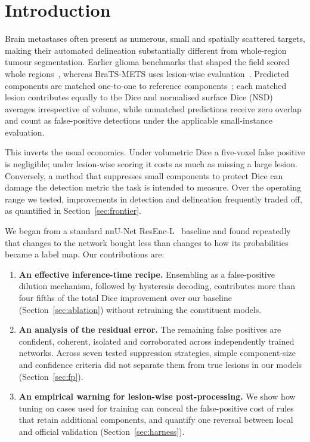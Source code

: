 \documentclass[runningheads]{llncs}
\begin{document}
\section{Introduction}
\label{sec:intro}

Brain metastases often present as numerous, small and spatially scattered targets, making their
automated delineation substantially different from whole-region tumour segmentation. Earlier
glioma benchmarks that shaped the field scored whole regions~\cite{baid2021}, whereas BraTS-METS
uses lesion-wise evaluation~\cite{bratsmet2023,bratsmet2025,brats2026}. Predicted components are
matched one-to-one to reference components~\cite{grosskopf2026matching}; each matched lesion
contributes equally to the Dice and normalised surface Dice (NSD) averages irrespective of volume,
while unmatched predictions receive zero overlap and count as false-positive detections under the
applicable small-instance evaluation.

This inverts the usual economics. Under volumetric Dice a five-voxel false positive is
negligible; under lesion-wise scoring it costs as much as missing a large lesion. Conversely, a
method that suppresses small components to protect Dice can damage the detection metric the task
is intended to measure. Over the operating range we tested, improvements in detection and
delineation frequently traded off, as quantified in Section~\ref{sec:frontier}.

We began from a standard nnU-Net ResEnc-L~\cite{isensee2021nnunet,isensee2024resenc} baseline and
found repeatedly that changes to the network bought less than changes to how its probabilities
became a label map. Our contributions are:

\begin{enumerate}
\item \textbf{An effective inference-time recipe.} Ensembling as a false-positive dilution
      mechanism, followed by hysteresis decoding, contributes more than four fifths of the total
      Dice improvement over our baseline (Section~\ref{sec:ablation}) without retraining the
      constituent models.
\item \textbf{An analysis of the residual error.} The remaining false positives are confident,
      coherent, isolated and corroborated across independently trained networks. Across seven
      tested suppression strategies, simple component-size and confidence criteria did not
      separate them from true lesions in our models (Section~\ref{sec:fp}).
\item \textbf{An empirical warning for lesion-wise post-processing.} We show how tuning on cases
      used for training can conceal the false-positive cost of rules that retain additional
      components, and quantify one reversal between local and official validation
      (Section~\ref{sec:harness}).
\end{enumerate}
\end{document}
